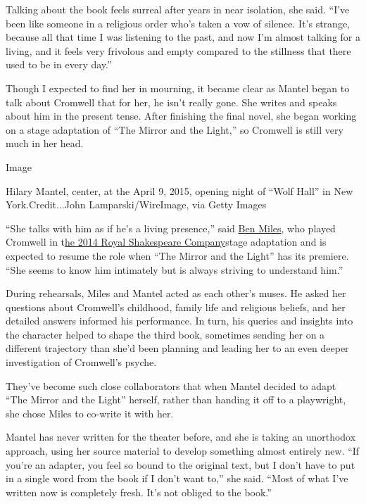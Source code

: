 Talking about the book feels surreal after years in near isolation, she
said. ``I've been like someone in a religious order who's taken a vow of
silence. It's strange, because all that time I was listening to the
past, and now I'm almost talking for a living, and it feels very
frivolous and empty compared to the stillness that there used to be in
every day.''

Though I expected to find her in mourning, it became clear as Mantel
began to talk about Cromwell that for her, he isn't really gone. She
writes and speaks about him in the present tense. After finishing the
final novel, she began working on a stage adaptation of ``The Mirror and
the Light,'' so Cromwell is still very much in her head.

Image

Hilary Mantel, center, at the April 9, 2015, opening night of ``Wolf
Hall'' in New York.Credit...John Lamparski/WireImage, via Getty Images

``She talks with him as if he's a living presence,'' said
\href{https://www.nytimes.com/2015/03/22/theater/ben-miles-takes-on-wolf-hall-onstage.html}{Ben
Miles}, who played Cromwell in
t\href{https://www.nytimes.com/2014/01/05/theater/wolf-hall-and-bring-up-the-bodies-head-for-the-stage.html}{he
2014 Royal Shakespeare Company}stage adaptation and is expected to
resume the role when ``The Mirror and the Light'' has its premiere.
``She seems to know him intimately but is always striving to understand
him.''

During rehearsals, Miles and Mantel acted as each other's muses. He
asked her questions about Cromwell's childhood, family life and
religious beliefs, and her detailed answers informed his performance. In
turn, his queries and insights into the character helped to shape the
third book, sometimes sending her on a different trajectory than she'd
been planning and leading her to an even deeper investigation of
Cromwell's psyche.

They've become such close collaborators that when Mantel decided to
adapt ``The Mirror and the Light'' herself, rather than handing it off
to a playwright, she chose Miles to co-write it with her.

Mantel has never written for the theater before, and she is taking an
unorthodox approach, using her source material to develop something
almost entirely new. ``If you're an adapter, you feel so bound to the
original text, but I don't have to put in a single word from the book if
I don't want to,'' she said. ``Most of what I've written now is
completely fresh. It's not obliged to the book.''

